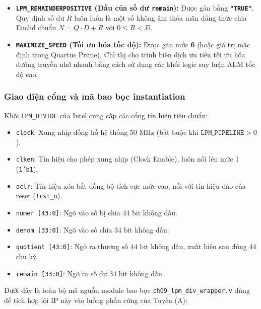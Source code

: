 \begin{itemize}[leftmargin=1.5em, itemsep=4pt]
    \item \textbf{\texttt{LPM\_REMAINDERPOSITIVE} (Dấu của số dư \texttt{remain}):} Được gán bằng \textbf{\texttt{"TRUE"}}.
    Quy định số dư $R$ luôn luôn là một số không âm thỏa mãn đẳng thức chia Euclid chuẩn $N = Q \cdot D + R$ với $0 \le R < D$.

    \item \textbf{\texttt{MAXIMIZE\_SPEED} (Tối ưu hóa tốc độ):} Được gán mức \textbf{6} (hoặc giá trị mặc định trong Quartus Prime).
    Chỉ thị cho trình biên dịch ưu tiên tối ưu hóa đường truyền nhớ nhanh bằng cách sử dụng các khối logic suy luận ALM tốc độ cao.
\end{itemize}

\subsubsection*{Giao diện cổng và mã bao bọc instantiation}
Khối \texttt{LPM\_DIVIDE} của Intel cung cấp các cổng tín hiệu tiêu chuẩn:
\begin{itemize}[leftmargin=1.5em, itemsep=2pt]
    \item \texttt{clock}: Xung nhịp đồng hồ hệ thống $50\text{ MHz}$ (bắt buộc khi $\texttt{LPM\_PIPELINE} > 0$).
    \item \texttt{clken}: Tín hiệu cho phép xung nhịp (Clock Enable), luôn nối lên mức 1 (\texttt{1'b1}).
    \item \texttt{aclr}: Tín hiệu xóa bất đồng bộ tích cực mức cao, nối với tín hiệu đảo của reset (\texttt{!rst\_n}).
    \item \texttt{numer [43:0]}: Ngõ vào số bị chia $44\text{ bit}$ không dấu.
    \item \texttt{denom [33:0]}: Ngõ vào số chia $34\text{ bit}$ không dấu.
    \item \texttt{quotient [43:0]}: Ngõ ra thương số $44\text{ bit}$ không dấu, xuất hiện sau đúng 44 chu kỳ.
    \item \texttt{remain [33:0]}: Ngõ ra số dư $34\text{ bit}$ không dấu.
\end{itemize}

Dưới đây là toàn bộ mã nguồn module bao bọc \texttt{ch09\_lpm\_div\_wrapper.v} dùng để tích hợp lõi IP này vào luồng phần cứng của Tuyến (A):



